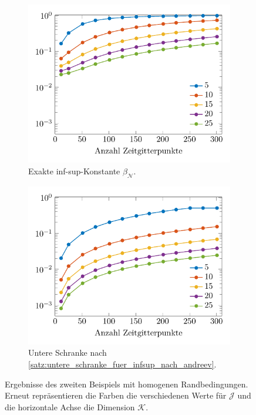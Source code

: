 \documentclass[../main.tex]{subfiles}
\begin{document}
\begin{figure}[tb!]
    \centering
    \centering
    \begin{subfigure}[b]{0.495\textwidth}
        \centering
        \includegraphics[width=1\textwidth]{figures/chapter4/stability_sine_dataset2_fig_1.pdf}
        \caption{Exakte inf-sup-Konstante $\beta_{\mathcal N}$.}
    \end{subfigure}
    \begin{subfigure}[b]{0.495\textwidth}
        \centering
        \includegraphics[width=1\textwidth]{figures/chapter4/stability_sine_dataset2_fig_2.pdf}
        \caption{Untere Schranke nach \cref{satz:untere_schranke_fuer_infsup_nach_andreev}.}
    \end{subfigure}
    \caption[Stabilität der Diskretisierung mit homogenen Randbedingungen, zweites Beispiel.]{%
        Ergebnisse des zweiten Beispiels mit homogenen Randbedingungen.
        Erneut repräsentieren die Farben die verschiedenen Werte für $\mathcal J$ und die horizontale Achse die Dimension $\mathcal K$.
        }
    \label{figure:infsup_homogen_zwei_felder}
\end{figure}
\end{document}
